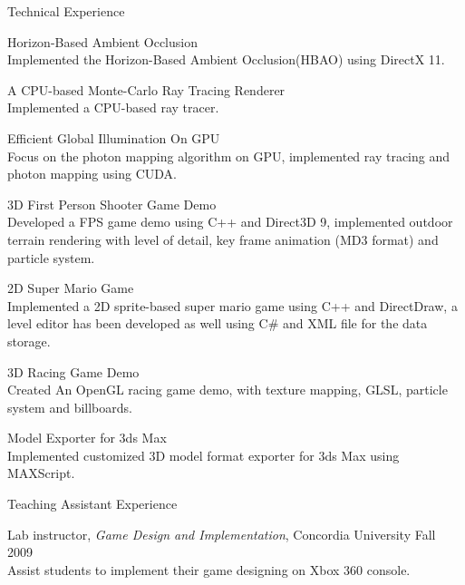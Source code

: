 \documentclass[10pt]{article}
\newenvironment{mydescription}{%
    \begin{description}
        \setlength{\itemsep}{0.25em}%
        \setlength{\parsep}{0em}%
        \setlength{\topsep}{\itemsep}%
        \setlength{\parskip}{0em}%
        \setlength{\labelwidth}{0.1em}
        \setlength{\labelsep}{0em} 
    }%
{\end{description}}
\begin{document}
\begin{cv}
\begin{cvlist}{Technical Experience}
\item
    \begin{mydescription}
        \item[Horizon-Based Ambient Occlusion] \hfill \\
			Implemented the Horizon-Based Ambient Occlusion(HBAO) using DirectX 11. 

		\item[A CPU-based Monte-Carlo Ray Tracing Renderer] \hfill \\
			Implemented a CPU-based ray tracer. 

        \item[Efficient Global Illumination On GPU] \hfill \\
            Focus on the photon mapping algorithm on GPU, implemented ray tracing and photon mapping using CUDA. 

        \item[3D First Person Shooter Game Demo] \hfill \\
            Developed a FPS game demo using C++ and Direct3D 9, implemented outdoor terrain rendering with level of detail, key frame animation (MD3 format) and particle system.

        \item[2D Super Mario Game] \hfill \\
            Implemented a 2D sprite-based super mario game using C++ and DirectDraw, a level editor has been developed as well using C\# and XML file for the data storage.

        \item[3D Racing Game Demo] \hfill \\ 
            Created An OpenGL racing game demo, with texture mapping, GLSL, particle system and billboards.


        \item[Model Exporter for 3ds Max] \hfill \\
            Implemented customized 3D model format exporter for 3ds Max using MAXScript.
    \end{mydescription}
\end{cvlist}

\begin{cvlist}{Teaching Assistant Experience}
\item
    \begin{mydescription}
        \item[Lab instructor, \emph{Game Design and Implementation}, Concordia University] \hfill Fall 2009\\
            Assist students to implement their game designing on Xbox 360 console. 


\end{mydescription}
\end{cvlist}
\end{cv}
\end{document}
